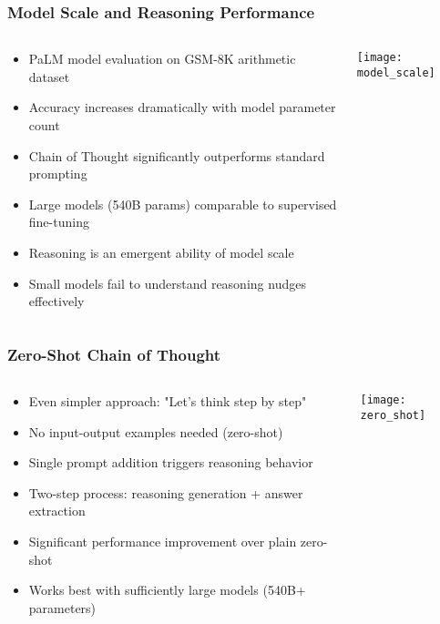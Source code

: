 \begin{frame}[fragile]\frametitle{Model Scale and Reasoning Performance}
\begin{columns}
    \begin{column}[T]{0.6\linewidth}
      \begin{itemize}
        \item PaLM model evaluation on GSM-8K arithmetic dataset
        \item Accuracy increases dramatically with model parameter count
        \item Chain of Thought significantly outperforms standard prompting
        \item Large models (540B params) comparable to supervised fine-tuning
        \item Reasoning is an emergent ability of model scale
        \item Small models fail to understand reasoning nudges effectively
      \end{itemize}
    \end{column}
    \begin{column}[T]{0.4\linewidth}
        \begin{center}
        \texttt{[image: model\_scale]}
        \end{center}	
    \end{column}
  \end{columns}
\end{frame}

\begin{frame}[fragile]\frametitle{Zero-Shot Chain of Thought}
\begin{columns}
    \begin{column}[T]{0.6\linewidth}
      \begin{itemize}
        \item Even simpler approach: "Let's think step by step"
        \item No input-output examples needed (zero-shot)
        \item Single prompt addition triggers reasoning behavior
        \item Two-step process: reasoning generation + answer extraction
        \item Significant performance improvement over plain zero-shot
        \item Works best with sufficiently large models (540B+ parameters)
      \end{itemize}
    \end{column}
    \begin{column}[T]{0.4\linewidth}
        \begin{center}
        \texttt{[image: zero\_shot]}
        \end{center}	
    \end{column}
  \end{columns}
\end{frame}

